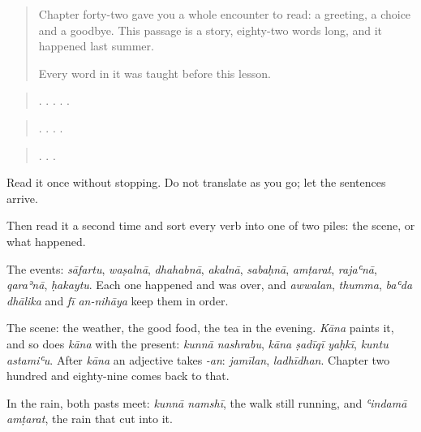 \begin{quote}
Chapter forty-two gave you a whole encounter to read: a greeting, a choice and a goodbye. This passage is a story, eighty-two words long, and it happened last summer.

Every word in it was taught before this lesson.
\end{quote}

\begin{tcolorbox}[breakable,skin=enhanced,colback=orange!6,colframe=orange!45!black,boxrule=0.5pt,arc=1mm,left=6pt,right=6pt,top=4pt,bottom=4pt,fonttitle=\bfseries,title={Read this}]
\begin{quote}
           .   .      .         .     .
\end{quote}

\begin{quote}
         .   .        .        .
\end{quote}

\begin{quote}
     .       .     .
\end{quote}

Read it once without stopping. Do not translate as you go; let the sentences arrive.

Then read it a second time and sort every verb into one of two piles: the scene, or what happened.
\end{tcolorbox}

\begin{culture}
The events: \emph{sāfartu}, \emph{waṣalnā}, \emph{dhahabnā}, \emph{akalnā}, \emph{sabaḥnā}, \emph{amṭarat}, \emph{rajaʿnā}, \emph{qaraʾnā}, \emph{ḥakaytu}. Each one happened and was over, and \emph{awwalan}, \emph{thumma}, \emph{baʿda dhālika} and \emph{fī an-nihāya} keep them in order.

The scene: the weather, the good food, the tea in the evening. \emph{Kāna} paints it, and so does \emph{kāna} with the present: \emph{kunnā nashrabu}, \emph{kāna ṣadīqī yaḥkī}, \emph{kuntu astamiʿu}. After \emph{kāna} an adjective takes \emph{-an}: \emph{jamīlan}, \emph{ladhīdhan}. Chapter two hundred and eighty-nine comes back to that.

In the rain, both pasts meet: \emph{kunnā namshī}, the walk still running, and \emph{ʿindamā amṭarat}, the rain that cut into it.
\end{culture}


